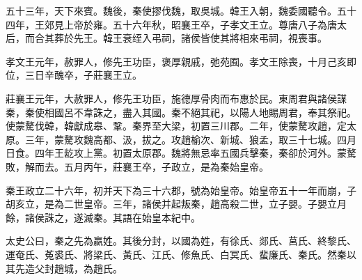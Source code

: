 五十三年，天下來賓。魏後，秦使摎伐魏，取吳城。韓王入朝，魏委國聽令。五十四年，王郊見上帝於雍。五十六年秋，昭襄王卒，子孝文王立。尊唐八子為唐太后，而合其葬於先王。韓王衰绖入弔祠，諸侯皆使其將相來弔祠，視喪事。

孝文王元年，赦罪人，修先王功臣，褒厚親戚，弛苑囿。孝文王除喪，十月己亥即位，三日辛醜卒，子莊襄王立。

莊襄王元年，大赦罪人，修先王功臣，施德厚骨肉而布惠於民。東周君與諸侯謀秦，秦使相國呂不韋誅之，盡入其國。秦不絕其祀，以陽人地賜周君，奉其祭祀。使蒙驁伐韓，韓獻成皋、鞏。秦界至大梁，初置三川郡。二年，使蒙驁攻趙，定太原。三年，蒙驁攻魏高都、汲，拔之。攻趙榆次、新城、狼孟，取三十七城。四月日食。四年王龁攻上黨。初置太原郡。魏將無忌率五國兵擊秦，秦卻於河外。蒙驁敗，解而去。五月丙午，莊襄王卒，子政立，是為秦始皇帝。

秦王政立二十六年，初并天下為三十六郡，號為始皇帝。始皇帝五十一年而崩，子胡亥立，是為二世皇帝。三年，諸侯并起叛秦，趙高殺二世，立子嬰。子嬰立月餘，諸侯誅之，遂滅秦。其語在始皇本紀中。

太史公曰，秦之先為嬴姓。其後分封，以國為姓，有徐氏、郯氏、莒氏、終黎氏、運奄氏、菟裘氏、將梁氏、黃氏、江氏、修魚氏、白冥氏、蜚廉氏、秦氏。然秦以其先造父封趙城，為趙氏。